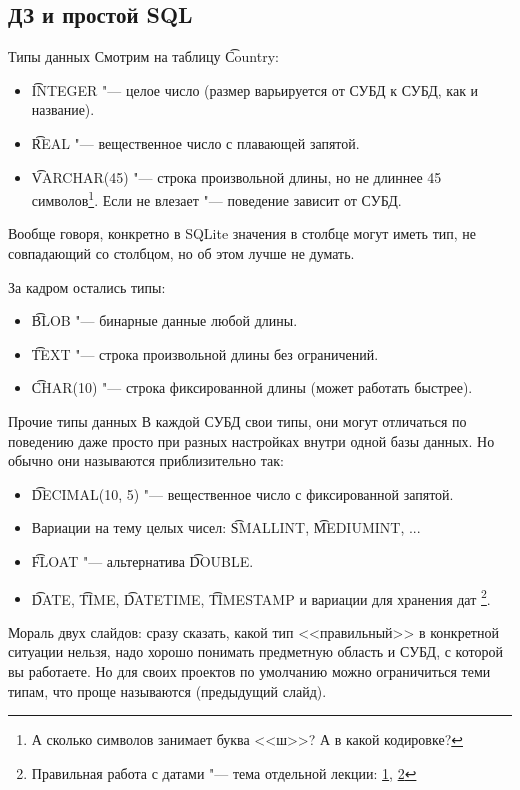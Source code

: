 \subsection{ДЗ и простой SQL}

\begin{frame}{Типы данных}
	Смотрим на таблицу \t{Country}:
	\begin{itemize}
		\item \t{INTEGER} "--- целое число (размер варьируется от СУБД к СУБД, как и название).
		\item \t{REAL} "--- вещественное число с плавающей запятой.
		\item \t{VARCHAR(45)} "--- строка произвольной длины, но не длиннее 45 символов\footnote{А сколько символов занимает буква <<ш>>? А в какой кодировке?}.
			Если не влезает "--- поведение зависит от СУБД.
	\end{itemize}
	Вообще говоря, конкретно в SQLite значения в столбце могут иметь тип, не совпадающий со столбцом, но об этом лучше не думать.

	За кадром остались типы:
	\begin{itemize}
		\item \t{BLOB} "--- бинарные данные любой длины.
		\item \t{TEXT} "--- строка произвольной длины без ограничений.
		\item \t{CHAR(10)} "--- строка фиксированной длины (может работать быстрее).
	\end{itemize}
\end{frame}

\begin{frame}{Прочие типы данных}
	В каждой СУБД свои типы, они могут отличаться по поведению даже просто при разных настройках внутри одной базы данных.
	Но обычно они называются приблизительно так:

	\begin{itemize}
		\item \t{DECIMAL(10, 5)} "--- вещественное число с фиксированной запятой.
		\item Вариации на тему целых чисел: \t{SMALLINT}, \t{MEDIUMINT}, ...
		\item \t{FLOAT} "--- альтернатива \t{DOUBLE}.
		\item \t{DATE}, \t{TIME}, \t{DATETIME}, \t{TIMESTAMP} и вариации для хранения дат
			\footnote{Правильная работа с датами "--- тема отдельной лекции: \href{https://habrahabr.ru/post/146109/}{1}, \href{https://habrahabr.ru/company/mailru/blog/242645/}{2}}.
	\end{itemize}

	Мораль двух слайдов: сразу сказать, какой тип <<правильный>> в конкретной ситуации нельзя,
	надо хорошо понимать предметную область и СУБД, с которой вы работаете.
	Но для своих проектов по умолчанию можно ограничиться теми типам, что проще называются (предыдущий слайд).
\end{frame}

